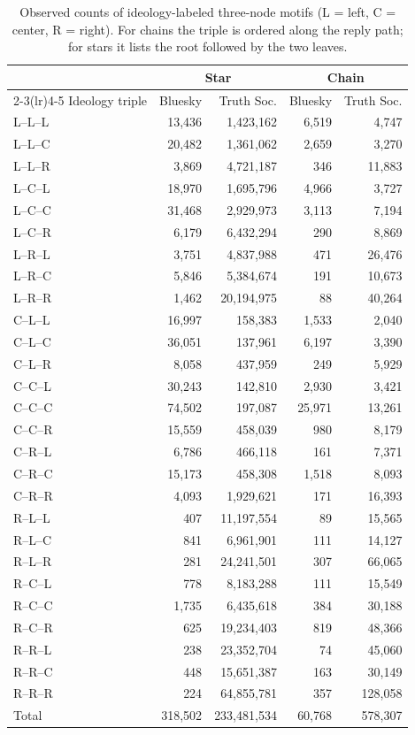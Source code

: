 \documentclass[letterpaper]{article} %
\newcommand{\rev}[1]{{\color{blue}#1}}
\begin{document}
\begin{table}[!t]
\centering
\footnotesize
\setlength{\tabcolsep}{3.5pt}
\rev{
\begin{tabular}{lrrrr}
\toprule
 & \multicolumn{2}{c}{Star} & \multicolumn{2}{c}{Chain} \\
\cmidrule(lr){2-3}\cmidrule(lr){4-5}
Ideology triple & Bluesky & Truth Soc. & Bluesky & Truth Soc. \\
\midrule
L--L--L & 13,436 & 1,423,162 & 6,519 & 4,747 \\
L--L--C & 20,482 & 1,361,062 & 2,659 & 3,270 \\
L--L--R & 3,869 & 4,721,187 & 346 & 11,883 \\
L--C--L & 18,970 & 1,695,796 & 4,966 & 3,727 \\
L--C--C & 31,468 & 2,929,973 & 3,113 & 7,194 \\
L--C--R & 6,179 & 6,432,294 & 290 & 8,869 \\
L--R--L & 3,751 & 4,837,988 & 471 & 26,476 \\
L--R--C & 5,846 & 5,384,674 & 191 & 10,673 \\
L--R--R & 1,462 & 20,194,975 & 88 & 40,264 \\
C--L--L & 16,997 & 158,383 & 1,533 & 2,040 \\
C--L--C & 36,051 & 137,961 & 6,197 & 3,390 \\
C--L--R & 8,058 & 437,959 & 249 & 5,929 \\
C--C--L & 30,243 & 142,810 & 2,930 & 3,421 \\
C--C--C & 74,502 & 197,087 & 25,971 & 13,261 \\
C--C--R & 15,559 & 458,039 & 980 & 8,179 \\
C--R--L & 6,786 & 466,118 & 161 & 7,371 \\
C--R--C & 15,173 & 458,308 & 1,518 & 8,093 \\
C--R--R & 4,093 & 1,929,621 & 171 & 16,393 \\
R--L--L & 407 & 11,197,554 & 89 & 15,565 \\
R--L--C & 841 & 6,961,901 & 111 & 14,127 \\
R--L--R & 281 & 24,241,501 & 307 & 66,065 \\
R--C--L & 778 & 8,183,288 & 111 & 15,549 \\
R--C--C & 1,735 & 6,435,618 & 384 & 30,188 \\
R--C--R & 625 & 19,234,403 & 819 & 48,366 \\
R--R--L & 238 & 23,352,704 & 74 & 45,060 \\
R--R--C & 448 & 15,651,387 & 163 & 30,149 \\
R--R--R & 224 & 64,855,781 & 357 & 128,058 \\
\midrule
Total & 318,502 & 233,481,534 & 60,768 & 578,307 \\
\bottomrule
\end{tabular}
}
\caption{\rev{Observed counts of ideology-labeled three-node motifs (L = left, C = center, R = right). For chains the triple is ordered along the reply path; for stars it lists the root followed by the two leaves.}}
\label{tab:motifcounts}
\end{table}
\end{document}
